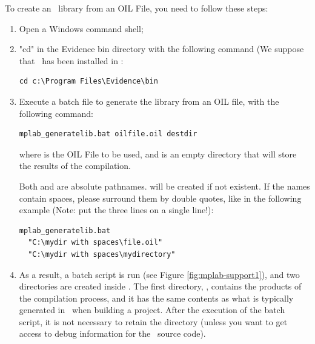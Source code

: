 To create an \ee\ library from an OIL File, you need to follow these steps:
\begin{enumerate}
\item 
  Open a Windows command shell;

\item 
  "cd" in the Evidence bin directory with the following command (We
  suppose that \ee\ has been installed in :

\begin{lstlisting}
cd c:\Program Files\Evidence\bin
\end{lstlisting}

\item
  Execute a batch file to generate the library from an OIL file, with the following command:

\begin{lstlisting}
mplab_generatelib.bat oilfile.oil destdir
\end{lstlisting}

where  is the OIL File to be used, and
 is an empty directory that will store the results of
the compilation.

\begin{warning} 

Both  and  are absolute
pathnames.  will be created if not existent. If the
names contain spaces, please surround them by double quotes, like in
the following example (Note: put the three lines on a single line!):

\begin{lstlisting}
mplab_generatelib.bat 
  "C:\mydir with spaces\file.oil"
  "C:\mydir with spaces\mydirectory"
\end{lstlisting}

\end{warning}

\item
  As a result, a batch script is run (see Figure
  \ref{fig:mplab-support1}), and two directories are created
  inside . The first directory, , contains
  the products of the compilation process, and it has the same
  contents as what is typically generated in \rtd\ when building a
  project. After the execution of the batch script, it is not
  necessary to retain the  directory (unless you want to
  get access to debug information for the \ee\ source code).


\end{enumerate}
